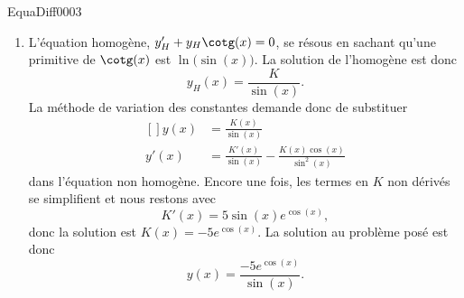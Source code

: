 \begin{corrige}{EquaDiff0003}
\begin{enumerate}
\item
L'équation homogène, $y'_H+y_H\cotg(x)=0$, se résous en sachant qu'une primitive de $\cotg(x)$ est $\ln\big(\sin(x)\big)$. La solution de l'homogène est donc
\begin{equation}
	y_H(x)=\frac{ K }{ \sin(x) }.
\end{equation}
La méthode de variation des constantes demande donc de substituer
\begin{equation}
	\begin{aligned}[]
		y(x)&=\frac{ K(x) }{ \sin(x) }\\
		y'(x)&=\frac{ K'(x) }{ \sin(x) }-\frac{ K(x)\cos(x) }{ \sin^2(x) }
	\end{aligned}
\end{equation}
dans l'équation non homogène. Encore une fois, les termes en $K$ non dérivés se simplifient et nous restons avec
\begin{equation}
	K'(x)=5\sin(x) e^{\cos(x)},
\end{equation}
donc la solution est $K(x)=-5 e^{\cos(x)}$. La solution au problème posé est donc
\begin{equation}
	y(x)=\frac{ -5 e^{\cos(x)} }{ \sin(x) }.
\end{equation}


\end{enumerate}


\end{corrige}
